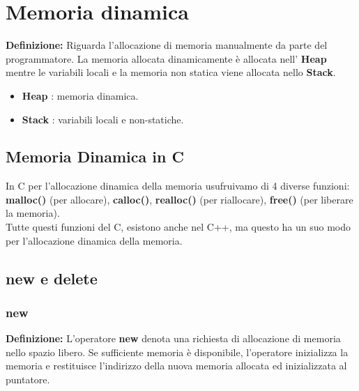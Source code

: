 

\newpage

\section{Memoria dinamica}

\textsf{\small \textbf{Definizione: } Riguarda l'allocazione di memoria manualmente da parte del programmatore. La memoria allocata dinamicamente è allocata nell' \textbf{Heap} mentre le variabili locali e la memoria non statica viene allocata nello \textbf{Stack}.}

\begin{itemize}
	\item \textsf{\small \textbf{Heap} : memoria dinamica.}
	\item \textsf{\small \textbf{Stack} : variabili locali e non-statiche.}
\end{itemize}

\subsection{Memoria Dinamica in C}

\textsf{\small In C per l'allocazione dinamica della memoria usufruivamo di 4 diverse funzioni: \textbf{malloc()} (per allocare), \textbf{calloc()}, \textbf{realloc()} (per riallocare), \textbf{free()} (per liberare la memoria).} \\

\textsf{\small Tutte questi funzioni del C, esistono anche nel C++, ma questo ha un suo modo per l'allocazione dinamica della memoria.} \break

\subsection{new e delete}

\subsubsection{new}

\textsf{\small \textbf{Definizione: } L'operatore \textbf{new} denota una richiesta di allocazione di memoria nello spazio libero. Se sufficiente memoria è disponibile, l'operatore inizializza la memoria e restituisce l'indirizzo della nuova memoria allocata ed inizializzata al puntatore.} \\

